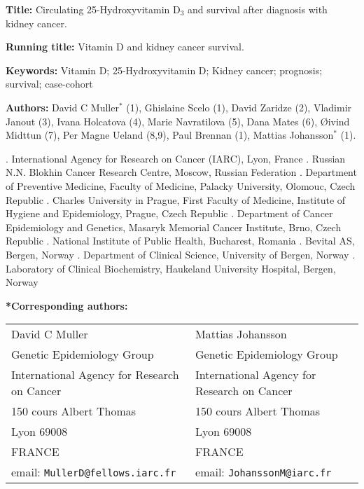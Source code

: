 \documentclass[a4paper,11pt]{article}
\begin{document}
\doublespace
\noindent \textbf{Title:} Circulating 25-Hydroxyvitamin D$_3$ and 
survival after diagnosis with kidney cancer. 

\noindent \textbf{Running title:} Vitamin D and kidney cancer survival.

\noindent \textbf{Keywords:} Vitamin D; 25-Hydroxyvitamin D; Kidney cancer; 
prognosis; survival; case-cohort

\noindent \textbf{Authors:} David C Muller$^*$ (1), Ghislaine Scelo (1),  David 
Zaridze (2), Vladimir Janout (3), Ivana Holcatova (4), Marie Navratilova (5), 
Dana Mates (6), {\O}ivind Midttun (7), Per Magne Ueland (8,9), Paul Brennan (1), 
Mattias Johansson$^*$  (1).

{\footnotesize 
{}. International Agency for Research on Cancer (IARC), Lyon, France . Russian N.N. Blokhin Cancer Research Centre, Moscow, Russian Federation 
. Department of Preventive Medicine, Faculty of Medicine, Palacky University, 
Olomouc, Czech Republic . Charles University in Prague, First Faculty of Medicine, Institute of 
Hygiene 
and Epidemiology, Prague, Czech Republic . Department of Cancer Epidemiology and Genetics, Masaryk Memorial Cancer 
Institute, Brno, Czech Republic . National Institute of Public Health, Bucharest, Romania . Bevital AS, Bergen, Norway . Department of Clinical Science, University of Bergen, Norway . Laboratory of Clinical Biochemistry, Haukeland University Hospital, Bergen, 
Norway
}

\noindent \textbf{*Corresponding authors:} 
\begin{table}[h!]
\begin{tabular}{ll}
David C Muller                  &      Mattias Johansson \\      
Genetic Epidemiology Group      &       Genetic Epidemiology Group  \\
International Agency for Research on Cancer & International Agency for Research on 
Cancer       \\
150 cours Albert Thomas         &  150 cours Albert Thomas      \\
Lyon 69008 &       Lyon 69008\\
FRANCE                     & FRANCE\\
email: \texttt{MullerD@fellows.iarc.fr} & 
email: \texttt{JohanssonM@iarc.fr}
\end{tabular}
\end{table}
\clearpage
\end{document}
